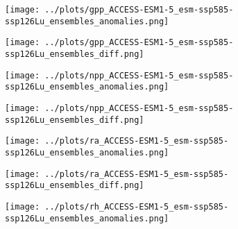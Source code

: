 \documentclass[]{article}
\begin{document}
\begin{figure}[H]
    \centering
    \begin{subfigure}[b]{0.4\linewidth}
        \texttt{[image: ../plots/gpp\_ACCESS-ESM1-5\_esm-ssp585-ssp126Lu\_ensembles\_anomalies.png]}
    \end{subfigure}
    \begin{subfigure}[b]{0.4\linewidth}
        \texttt{[image: ../plots/gpp\_ACCESS-ESM1-5\_esm-ssp585-ssp126Lu\_ensembles\_diff.png]}
    \end{subfigure}
    \begin{subfigure}[b]{0.4\linewidth}
        \texttt{[image: ../plots/npp\_ACCESS-ESM1-5\_esm-ssp585-ssp126Lu\_ensembles\_anomalies.png]}
    \end{subfigure}
    \begin{subfigure}[b]{0.4\linewidth}
        \texttt{[image: ../plots/npp\_ACCESS-ESM1-5\_esm-ssp585-ssp126Lu\_ensembles\_diff.png]}
    \end{subfigure}
    \begin{subfigure}[b]{0.4\linewidth}
        \texttt{[image: ../plots/ra\_ACCESS-ESM1-5\_esm-ssp585-ssp126Lu\_ensembles\_anomalies.png]}
    \end{subfigure}
    \begin{subfigure}[b]{0.4\linewidth}
        \texttt{[image: ../plots/ra\_ACCESS-ESM1-5\_esm-ssp585-ssp126Lu\_ensembles\_diff.png]}
    \end{subfigure}
    \begin{subfigure}[b]{0.4\linewidth}
        \texttt{[image: ../plots/rh\_ACCESS-ESM1-5\_esm-ssp585-ssp126Lu\_ensembles\_anomalies.png]}

\end{subfigure}
\end{figure}
\end{document}
